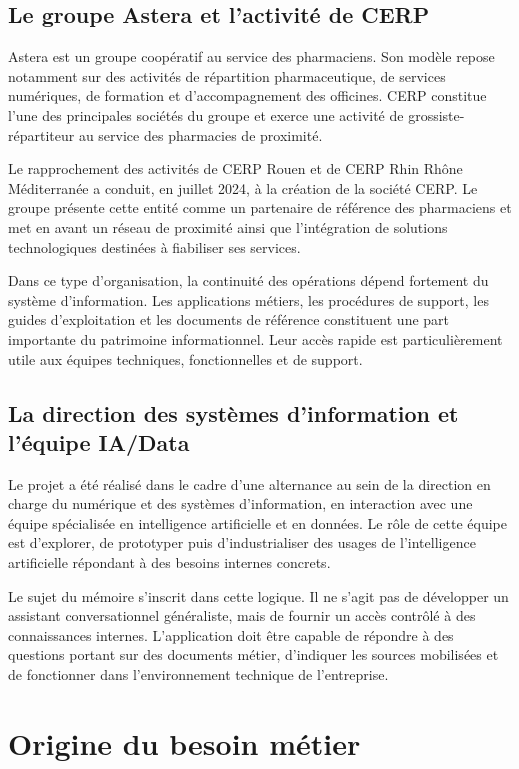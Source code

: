 \subsection{Le groupe Astera et l'activité de CERP}

Astera est un groupe coopératif au service des pharmaciens. Son modèle repose notamment sur des activités de répartition pharmaceutique, de services numériques, de formation et d'accompagnement des officines. CERP constitue l'une des principales sociétés du groupe et exerce une activité de grossiste-répartiteur au service des pharmacies de proximité.

Le rapprochement des activités de CERP Rouen et de CERP Rhin Rhône Méditerranée a conduit, en juillet 2024, à la création de la société CERP. Le groupe présente cette entité comme un partenaire de référence des pharmaciens et met en avant un réseau de proximité ainsi que l'intégration de solutions technologiques destinées à fiabiliser ses services.

Dans ce type d'organisation, la continuité des opérations dépend fortement du système d'information. Les applications métiers, les procédures de support, les guides d'exploitation et les documents de référence constituent une part importante du patrimoine informationnel. Leur accès rapide est particulièrement utile aux équipes techniques, fonctionnelles et de support.

\subsection{La direction des systèmes d'information et l'équipe IA/Data}

Le projet a été réalisé dans le cadre d'une alternance au sein de la direction en charge du numérique et des systèmes d'information, en interaction avec une équipe spécialisée en intelligence artificielle et en données. Le rôle de cette équipe est d'explorer, de prototyper puis d'industrialiser des usages de l'intelligence artificielle répondant à des besoins internes concrets.

Le sujet du mémoire s'inscrit dans cette logique. Il ne s'agit pas de développer un assistant conversationnel généraliste, mais de fournir un accès contrôlé à des connaissances internes. L'application doit être capable de répondre à des questions portant sur des documents métier, d'indiquer les sources mobilisées et de fonctionner dans l'environnement technique de l'entreprise.

\section{Origine du besoin métier}

